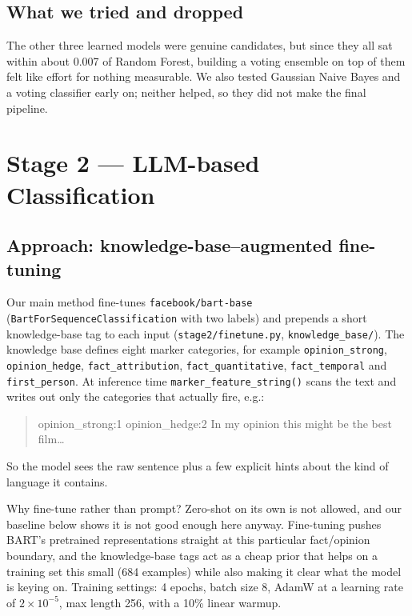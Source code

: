 \documentclass[10pt,a4paper]{article}
\begin{document}
\subsection{What we tried and dropped}
The other three learned models were genuine candidates, but since they all sat
within about 0.007 of Random Forest, building a voting ensemble on top of them
felt like effort for nothing measurable. We also tested Gaussian Naive Bayes and
a voting classifier early on; neither helped, so they did not make the final
pipeline.

\section{Stage 2 --- LLM-based Classification}

\subsection{Approach: knowledge-base--augmented fine-tuning}
Our main method fine-tunes \texttt{facebook/bart-base}
(\texttt{BartForSequenceClassification} with two labels) and prepends a short
knowledge-base tag to each input (\texttt{stage2/finetune.py},
\texttt{knowledge\_base/}). The knowledge base defines eight marker categories,
for example \texttt{opinion\_strong}, \texttt{opinion\_hedge},
\texttt{fact\_attribution}, \texttt{fact\_quantitative},
\texttt{fact\_temporal} and \texttt{first\_person}. At inference time
\texttt{marker\_feature\_string()} scans the text and writes out only the
categories that actually fire, e.g.:
\begin{quote}\small\ttfamily
[kb] opinion\_strong:1 opinion\_hedge:2 In my opinion this might be the best film\dots
\end{quote}
So the model sees the raw sentence plus a few explicit hints about the kind of
language it contains.

Why fine-tune rather than prompt? Zero-shot on its own is not allowed, and our
baseline below shows it is not good enough here anyway. Fine-tuning pushes BART's
pretrained representations straight at this particular fact/opinion boundary, and
the knowledge-base tags act as a cheap prior that helps on a training set this
small (684 examples) while also making it clear what the model is keying on.
Training settings: 4 epochs, batch size 8, AdamW at a learning rate of
$2\!\times\!10^{-5}$, max length 256, with a 10\% linear warmup.
\end{document}
